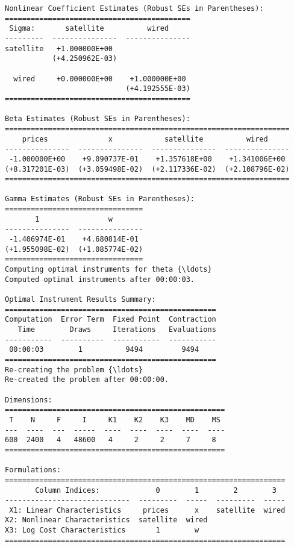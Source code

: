 \begin{Verbatim}[commandchars=\\\{\}]
Nonlinear Coefficient Estimates (Robust SEs in Parentheses):
===========================================
 Sigma:       satellite          wired
---------  ---------------  ---------------
satellite   +1.000000E+00
           (+4.250962E-03)

  wired     +0.000000E+00    +1.000000E+00
                            (+4.192555E-03)
===========================================

Beta Estimates (Robust SEs in Parentheses):
==================================================================
    prices              x            satellite          wired
---------------  ---------------  ---------------  ---------------
 -1.000000E+00    +9.090737E-01    +1.357618E+00    +1.341006E+00
(+8.317201E-03)  (+3.059498E-02)  (+2.117336E-02)  (+2.108796E-02)
==================================================================

Gamma Estimates (Robust SEs in Parentheses):
================================
       1                w
---------------  ---------------
 -1.406974E-01    +4.680814E-01
(+1.955098E-02)  (+1.085774E-02)
================================
Computing optimal instruments for theta {\ldots}
Computed optimal instruments after 00:00:03.

Optimal Instrument Results Summary:
=================================================
Computation  Error Term  Fixed Point  Contraction
   Time        Draws     Iterations   Evaluations
-----------  ----------  -----------  -----------
 00:00:03        1          9494         9494
=================================================
Re-creating the problem {\ldots}
Re-created the problem after 00:00:00.

Dimensions:
===================================================
 T    N     F     I     K1    K2    K3    MD    MS
---  ----  ---  -----  ----  ----  ----  ----  ----
600  2400   4   48600   4     2     2     7     8
===================================================

Formulations:
=================================================================
       Column Indices:             0        1        2        3
-----------------------------  ---------  -----  ---------  -----
 X1: Linear Characteristics     prices      x    satellite  wired
X2: Nonlinear Characteristics  satellite  wired
X3: Log Cost Characteristics       1        w
=================================================================
    \end{Verbatim}

